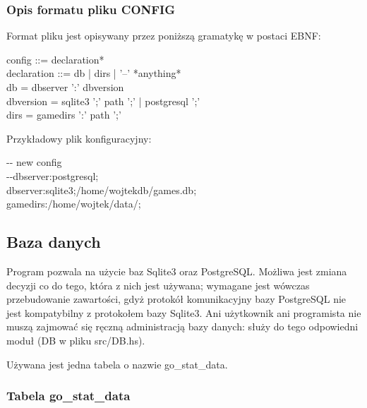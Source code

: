 \documentclass[10pt,leqno]{article}
\begin{document}
\subsubsection{Opis formatu pliku CONFIG}

Format pliku jest opisywany przez poniższą gramatykę w postaci EBNF:
\begin{framed}
\noindent config ::= declaration* \\ 
declaration ::= db | dirs | '--' *anything* \\
db = dbserver ':' dbversion \\ 
dbversion = sqlite3 ';' path ';' | postgresql ';' \\
dirs = gamedirs ':' path ';'
\end{framed}

Przykładowy plik konfiguracyjny:

\begin{framed}
\noindent \--\-- new config \\
\--\--dbserver:postgresql; \\ 
dbserver:sqlite3;/home/wojtekdb/games.db; \\
gamedirs:/home/wojtek/data/;
\end{framed}




\subsection{Baza danych}

Program pozwala na użycie baz Sqlite3 oraz PostgreSQL. Możliwa jest zmiana decyzji co do tego, która z nich jest używana; 
wymagane jest wówczas przebudowanie zawartości, gdyż protokół komunikacyjny bazy PostgreSQL nie jest kompatybilny z protokołem
bazy Sqlite3. Ani użytkownik ani programista nie muszą zajmować się ręczną administracją bazy danych: służy do tego odpowiedni
moduł (DB w pliku src/DB.hs). 

Używana jest jedna tabela o nazwie go\_stat\_data.

\subsubsection{Tabela go\_stat\_data}
\end{document}
